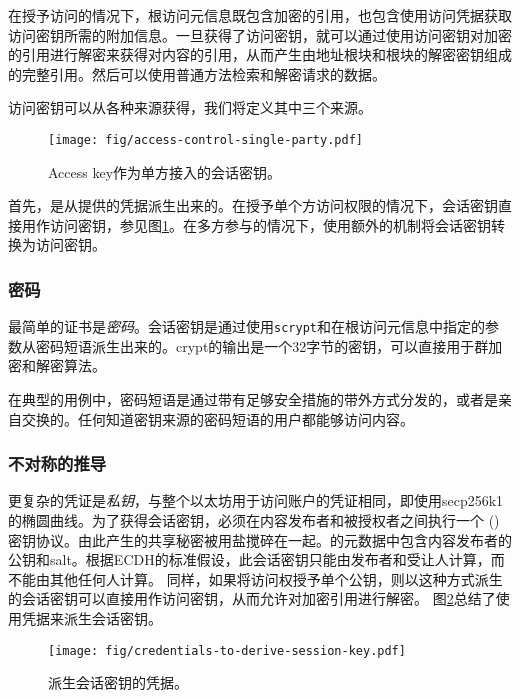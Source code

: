 在授予访问的情况下，根访问元信息既包含加密的引用，也包含使用访问凭据获取访问密钥所需的附加信息。一旦获得了访问密钥，就可以通过使用访问密钥对加密的引用进行解密来获得对内容的引用，从而产生由地址根块和根块的解密密钥组成的完整引用。然后可以使用普通方法检索和解密请求的数据。

访问密钥可以从各种来源获得，我们将定义其中三个来源。

\begin{figure}[htbp]
\centering
\texttt{[image: fig/access-control-single-party.pdf]}
\caption[Access key作为单方访问的会话密钥\statusyellow]{Access key作为单方接入的会话密钥。}
\label{fig:access-control-single-party}
\end{figure}

首先，是从提供的凭据派生出来的。在授予单个方访问权限的情况下，会话密钥直接用作访问密钥，参见图\ref{fig:access-control-single-party}。在多方参与的情况下，使用额外的机制将会话密钥转换为访问密钥。

\subsubsection{密码}
最简单的证书是\emph{密码}。会话密钥是通过使用\lstinline{scrypt}和在根访问元信息中指定的参数从密码短语派生出来的。crypt的输出是一个32字节的密钥，可以直接用于群加密和解密算法。

在典型的用例中，密码短语是通过带有足够安全措施的带外方式分发的，或者是亲自交换的。任何知道密钥来源的密码短语的用户都能够访问内容。

\subsubsection{不对称的推导}

更复杂的凭证是\emph{私钥}，与整个以太坊用于访问账户的凭证相同，即使用secp256k1的椭圆曲线。为了获得会话密钥，必须在内容发布者和被授权者之间执行一个 ()密钥协议。由此产生的共享秘密被用盐搅碎在一起。的元数据中包含内容发布者的公钥和salt。根据ECDH的标准假设，此会话密钥只能由发布者和受让人计算，而不能由其他任何人计算。
同样，如果将访问权授予单个公钥，则以这种方式派生的会话密钥可以直接用作访问密钥，从而允许对加密引用进行解密。
图\ref{fig:credentials-to-derive-session-key}总结了使用凭据来派生会话密钥。

\begin{figure}[htbp]
\centering
\texttt{[image: fig/credentials-to-derive-session-key.pdf]}
\caption[派生会话密钥的凭据\statusyellow]{派生会话密钥的凭据。}
\label{fig:credentials-to-derive-session-key}
\end{figure}


